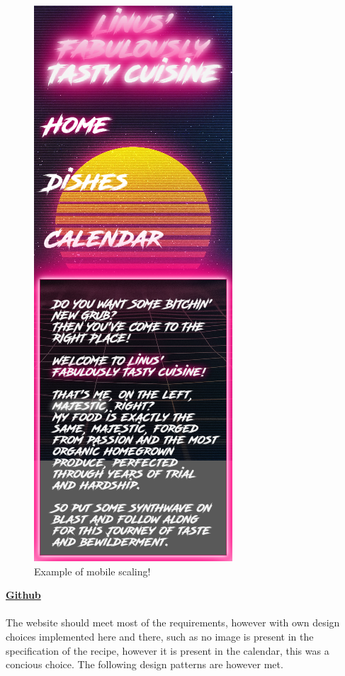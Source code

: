 \documentclass[a4paper]{scrartcl}
\begin{document}
\begin{figure}[H]
  \begin{center}
    \includegraphics[scale=0.35]{Scr1.png}
    \caption{Example of mobile scaling!}
    \label{fig:recipe}
  \end{center}
\end{figure}
\newpage
\newpage
\noindent
\textbf{\href{https://github.com/linus-dev/KTH-Projects/tree/master/ID1354/1}{Github}}\\\\
The website should meet most of the requirements, however with own design choices implemented here and
there, such as no image is present in the specification of the recipe, however it is present in the
calendar, this was a concious choice. The following design patterns are however met.
\end{document}
